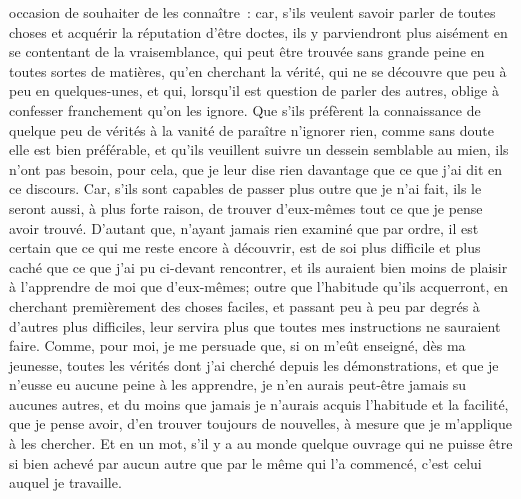 \documentclass[french,twoside]{book} %
\begin{document}
occasion de souhaiter de les connaître : car, s'ils veulent savoir parler de toutes choses et acquérir la réputation d'être doctes, ils y parviendront plus aisément en se contentant de la vraisemblance, qui peut être trouvée sans grande peine en toutes sortes de matières, qu'en cherchant la vérité, qui ne se découvre que peu à peu en quelques-unes, et qui, lorsqu'il est question de parler des autres, oblige à confesser franchement qu'on les ignore. Que s'ils préfèrent la connaissance de quelque peu de vérités à la vanité de paraître n'ignorer rien, comme sans doute elle est bien préférable, et qu'ils veuillent suivre un dessein semblable au mien, ils n'ont pas besoin, pour cela, que je leur dise rien davantage que ce que j'ai dit en ce discours. Car, s'ils sont capables de passer plus outre que je n'ai fait, ils le seront aussi, à plus forte raison, de trouver d'eux-mêmes tout ce que je pense avoir trouvé. D'autant que, n'ayant jamais rien examiné que par ordre, il est certain que ce qui me reste encore à découvrir, est de soi plus difficile et plus caché que ce que j'ai pu ci-devant rencontrer, et ils auraient bien moins de plaisir à l'apprendre de moi que d'eux-mêmes; outre que l'habitude qu'ils acquerront, en cherchant premièrement des choses faciles, et passant peu à peu par degrés à d'autres plus difficiles, leur servira plus que toutes mes instructions ne sauraient faire. Comme, pour moi, je me persuade que, si on m'eût enseigné, dès ma jeunesse, toutes les vérités dont j'ai cherché depuis les démonstrations, et que je n'eusse eu aucune peine à les apprendre, je n'en aurais peut-être jamais su aucunes autres, et du moins que jamais je n'aurais acquis l'habitude et la facilité, que je pense avoir, d'en trouver toujours de nouvelles, à mesure que je m'applique à les chercher. Et en un mot, s'il y a au monde quelque ouvrage qui ne puisse être si bien achevé par aucun autre que par le même qui l'a commencé, c'est celui auquel je travaille.\par
\par
\end{document}
